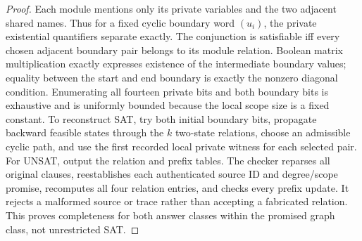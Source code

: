\documentclass[11pt]{article}
\begin{document}
\begin{proof}
Each module mentions only its private variables and the two adjacent shared names. Thus for a fixed cyclic boundary word $(u_i)$, the private existential quantifiers separate exactly. The conjunction is satisfiable iff every chosen adjacent boundary pair belongs to its module relation. Boolean matrix multiplication exactly expresses existence of the intermediate boundary values; equality between the start and end boundary is exactly the nonzero diagonal condition. Enumerating all fourteen private bits and both boundary bits is exhaustive and is uniformly bounded because the local scope size is a fixed constant. To reconstruct SAT, try both initial boundary bits, propagate backward feasible states through the $k$ two-state relations, choose an admissible cyclic path, and use the first recorded local private witness for each selected pair. For UNSAT, output the relation and prefix tables. The checker reparses all original clauses, reestablishes each authenticated source ID and degree/scope promise, recomputes all four relation entries, and checks every prefix update. It rejects a malformed source or trace rather than accepting a fabricated relation. This proves completeness for both answer classes within the promised graph class, not unrestricted SAT.
\end{proof}
\end{document}
